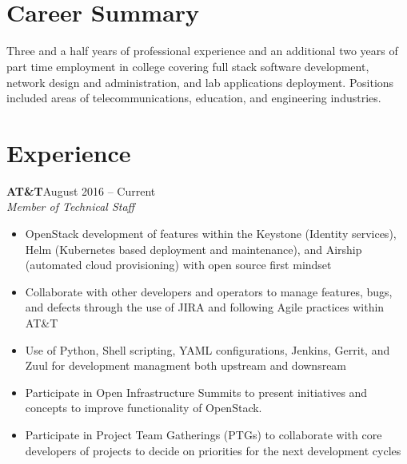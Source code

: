 \documentclass[margin]{res}
\begin{document}
  \\
  \\

\section{Career Summary} 
  Three and a half years of professional experience and an additional two years of part time employment in college covering full stack software development, network design and administration, and lab applications deployment. Positions included areas of telecommunications, education, and engineering industries. 

\section{Experience}
   \textbf{AT\&T}\hfill August 2016 -- Current\\
   \textit{Member of Technical Staff} 
   \begin{itemize} \itemsep -1pt  %
    \item OpenStack development of features within the Keystone (Identity services), Helm (Kubernetes based deployment and maintenance), and Airship (automated cloud provisioning) with open source first mindset
    \item Collaborate with other developers and operators to manage features, bugs, and defects through the use of JIRA and following Agile practices within AT\&T
    \item Use of Python, Shell scripting, YAML configurations, Jenkins, Gerrit, and Zuul for development managment both upstream and downsream
    \item Participate in Open Infrastructure Summits to present initiatives and concepts to improve functionality of OpenStack.
    \item Participate in Project Team Gatherings (PTGs) to collaborate with core developers of projects to decide on priorities for the next development cycles
   \end{itemize}
\end{document}
